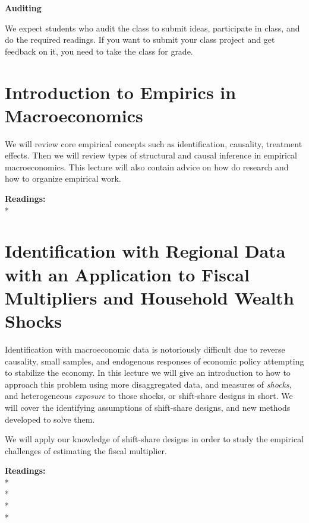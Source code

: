 \documentclass [12pt]{article}
\begin{document}
\noindent  \textbf{Auditing}

\noindent We expect students who audit the class to submit ideas, participate in class, and do the required readings. If you want to submit your class project and get feedback on it, you need to take the class for grade.





\section{Introduction to Empirics in Macroeconomics}

We will review core empirical concepts such as identification, causality, treatment effects. Then we will review types of structural and causal inference in empirical macroeconomics. This lecture will also contain advice on how do research and how to organize empirical work. 

\noindent\textbf{Readings:}\\
*

\section{Identification with Regional Data with an Application to Fiscal Multipliers and Household Wealth Shocks}

Identification with macroeconomic data is notoriously difficult due to reverse causality, small samples, and endogenous responses of economic policy attempting to stabilize the economy. In this lecture we will give an introduction to how to approach this problem using more disaggregated data, and measures of  \textit{shocks}, and heterogeneous \textit{exposure} to those shocks, or shift-share designs in short. We will cover the identifying assumptions of shift-share designs, and new methods developed to solve them. 

We will apply our knowledge of shift-share designs in order to study the empirical challenges of estimating the fiscal multiplier.

\noindent\textbf{Readings:}\\
*\\
*\\
*\\  
*\\
 \\
\\
\\
\\
\end{document}

